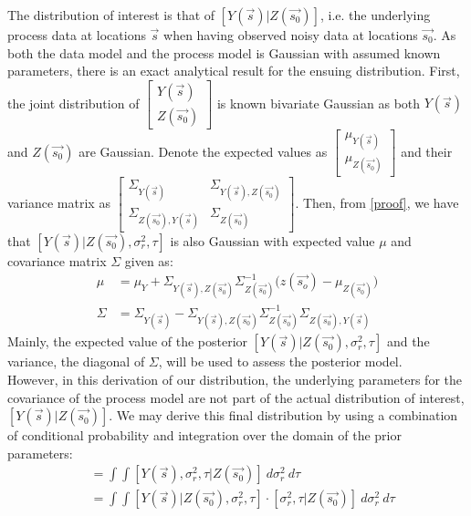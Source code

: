 \documentclass{report}
\begin{document}
The distribution of interest is that of $[Y(\vec{s}) | Z(\vec{s_0})]$, i.e. the underlying process data at locations $\vec{s}$ when having observed noisy data at locations $\vec{s_0}$. As both the data model and the process model is Gaussian with assumed known parameters, there is an exact analytical result for the ensuing distribution. First, the joint distribution of $\begin{bmatrix} Y(\vec{s}) \\ Z(\vec{s_0}) \end{bmatrix}$ is known bivariate Gaussian as both $ Y(\vec{s})$ and $Z(\vec{s_0})$ are Gaussian. Denote the expected values as $\begin{bmatrix} \mu_{Y(\vec{s})} \\ \mu_{Z(\vec{s_0})} \end{bmatrix}$ and their variance matrix as $\begin{bmatrix} \Sigma_{Y(\vec{s})} & \Sigma_{Y(\vec{s}), Z(\vec{s_0})} \\ \Sigma_{Z(\vec{s_0}), Y(\vec{s})} & \Sigma_{Z(\vec{s_0})} \end{bmatrix}$. Then, from \ref{proof}, we have that $[Y(\vec{s}) | Z(\vec{s_0}), \sigma_r^2, \tau]$ is also Gaussian with expected value $\mu$ and covariance matrix $\Sigma$ given as:
\begin{align*}
\mu &= \mu_Y + \Sigma_{Y(\vec{s}), Z(\vec{s_0})} \Sigma_{Z(\vec{s_0})}^{-1}\big(z(\vec{s_o}) - \mu_{Z(\vec{s_0})} \big)\\
\Sigma &= \Sigma_{Y(\vec{s})} - \Sigma_{Y(\vec{s}), Z(\vec{s_0})} \Sigma_{Z(\vec{s_0})}^{-1}\Sigma_{Z(\vec{s_0}), Y(\vec{s})}
\end{align*}
Mainly, the expected value of the posterior $[Y(\vec{s}) | Z(\vec{s_0}),\sigma_r^2, \tau]$ and the variance, the diagonal of $\Sigma$, will be used to assess the posterior model. \\
However, in this derivation of our distribution, the underlying parameters for the covariance of the process model are not part of the actual distribution of interest, $[Y(\vec{s}) | Z(\vec{s_0})]$. We may derive this final distribution by using a combination of conditional probability and integration over the domain of the prior parameters:
\begin{align*}
[Y(\vec{s}) | Z(\vec{s_0})] &= \int \int [Y(\vec{s}), \sigma_r^2, \tau | Z(\vec{s_0})] \ d\sigma_r^2 \ d\tau \\
&= \int \int [Y(\vec{s})| Z(\vec{s_0}), \sigma_r^2, \tau] \cdot [\sigma_r^2, \tau | Z(\vec{s_0})] \ d\sigma_r^2 \ d\tau
\end{align*}
\end{document}

